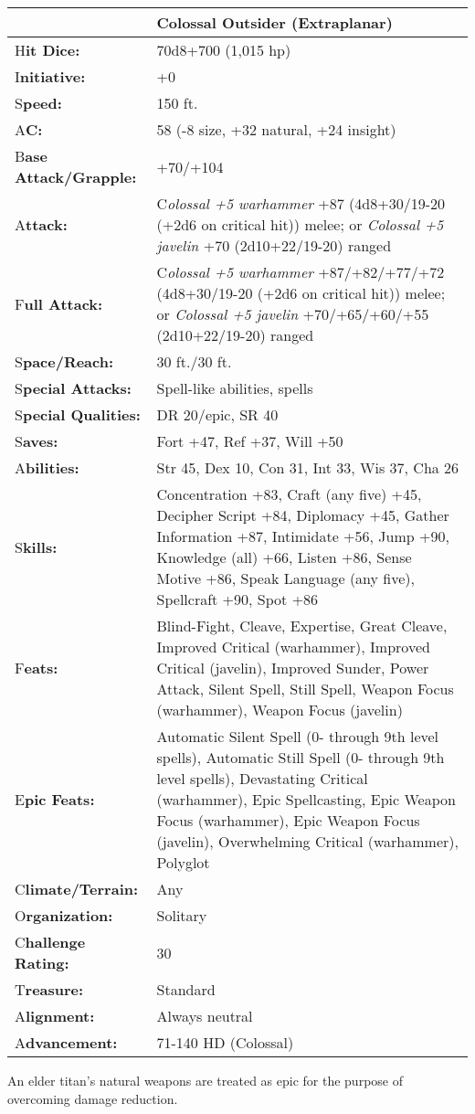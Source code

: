 \documentclass{article}
\begin{document}
{\begin{tabular}{|>{\raggedright}p{66pt}|>{\raggedright}p{259pt}|}
\hline
  & Colossal Outsider (Extraplanar)\tabularnewline
\hline
H\textbf{it Dice:} & 70d8+700 (1,015 hp) \tabularnewline
\hline
I\textbf{nitiative:} & +0 \tabularnewline
\hline
S\textbf{peed:} & 150 ft. \tabularnewline
\hline
A\textbf{C:} & 58 (-8 size, +32 natural, +24 insight) \tabularnewline
\hline
B\textbf{ase Attack/Grapple:} & +70/+104\tabularnewline
\hline
A\textbf{ttack:} & C\textit{olossal +5 warhammer }+87 (4d8+30/19-20 (+2d6 on critical 
hit)) melee; or \textit{Colossal +5 javelin }+70 (2d10+22/19-20) ranged\tabularnewline
\hline
F\textbf{ull Attack:} & C\textit{olossal +5 warhammer }+87/+82/+77/+72 (4d8+30/19-20 
(+2d6 on critical hit)) melee; or \textit{Colossal +5 javelin }+70/+65/+60/+55 
(2d10+22/19-20) ranged\tabularnewline
\hline
S\textbf{pace/Reach:} & 30 ft./30 ft. \tabularnewline
\hline
S\textbf{pecial Attacks:} & Spell-like abilities, spells \tabularnewline
\hline
S\textbf{pecial Qualities:} & DR 20/epic, SR 40 \tabularnewline
\hline
S\textbf{aves:} & Fort +47, Ref +37, Will +50 \tabularnewline
\hline
A\textbf{bilities:} & Str 45, Dex 10, Con 31, Int 33, Wis 37, Cha 26 \tabularnewline
\hline
S\textbf{kills:} & Concentration +83, Craft (any five) +45, Decipher Script +84, 
Diplomacy +45, Gather Information +87, Intimidate +56, Jump +90, Knowledge (all) 
+66, Listen +86, Sense Motive +86, Speak Language (any five), Spellcraft +90, Spot 
+86\tabularnewline
\hline
F\textbf{eats:} & Blind-Fight, Cleave, Expertise, Great Cleave, Improved Critical 
(warhammer), Improved Critical (javelin), Improved Sunder, Power Attack, Silent 
Spell, Still Spell, Weapon Focus (warhammer), Weapon Focus (javelin) \tabularnewline
\hline
E\textbf{pic Feats:} & Automatic Silent Spell (0- through 9th level spells), Automatic 
Still Spell (0- through 9th level spells), Devastating Critical (warhammer), Epic 
Spellcasting, Epic Weapon Focus (warhammer), Epic Weapon Focus (javelin), Overwhelming 
Critical (warhammer), Polyglot \tabularnewline
\hline
C\textbf{limate/Terrain:} & Any \tabularnewline
\hline
O\textbf{rganization:} & Solitary \tabularnewline
\hline
C\textbf{hallenge Rating:} & 30 \tabularnewline
\hline
T\textbf{reasure:} & Standard \tabularnewline
\hline
A\textbf{lignment:} & Always neutral \tabularnewline
\hline
A\textbf{dvancement:} & 71-140 HD (Colossal) \tabularnewline
\hline
\end{tabular}

An elder titan's natural weapons are treated as epic for the purpose of overcoming 
damage reduction.

}
\end{document}
